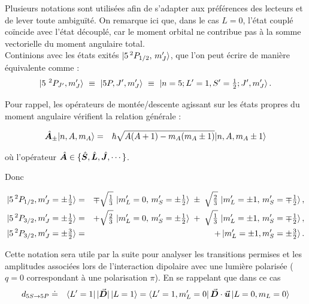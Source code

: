 Plusieurs notations sont utilisées afin de s’adapter aux préférences des lecteurs et de lever toute ambiguïté.
On remarque ici que, dans le cas $L = 0$, l’état couplé coïncide avec l’état découplé, car le moment orbital ne contribue pas à la somme vectorielle du moment angulaire total.\\

Continions avec les états exités $\ket{5\,^2P_{1/2},\,m_J'}$, que l’on peut écrire de manière équivalente comme :
\begin{eqnarray*}
	\ket{ 5{~}^2P_{J'} , m_J'  } ~\equiv~ \ket{ 5P , J'  , m_J' }  ~\equiv~ \ket{n=5 ; L'=1 , S'=\tfrac12 ;  J'  , m_J'  }.
\end{eqnarray*}

Pour rappel, les opérateurs de montée/descente agissant sur les états propres du moment angulaire vérifient la relation générale :


\begin{eqnarray}
	\hat{\bm{A}}_\pm \vert n , A , m	_A \rangle & = & \hbar \sqrt{A(A+1) - m_A(m_A\pm 1 ) } \vert n , A , m	_A \pm 1  \rangle
\end{eqnarray}

où l'opérateur $\hat{\bm{A}} \in \{ \hat{\bm{S}} , \hat{\bm{L}} , \hat{\bm{J}} , \cdots \}$.

Donc 

\begin{eqnarray*} 
	\ket{5\,^2P_{1/2},m_J' = \pm\tfrac12} &=& \mp\sqrt{\tfrac{1}{3}}\,\ket{ m_L'=0,\,m_S'=\pm\tfrac12} \;\pm\;\sqrt{\tfrac{2}{3}}\,\ket{m_L'=\pm 1,\,m_S'=\mp\tfrac12},\\ 
	\ket{5\,^2P_{3/2},m_J' = \pm\tfrac12} &=& +\sqrt{\tfrac{2}{3}}\,\ket{m_L'=0,\,m_S'=\pm\tfrac12} \;+\;\sqrt{\tfrac{1}{3}}\,\ket{ m_L'=\pm 1,\,m_S'=\mp\tfrac12},\\
	\ket{5\,^2P_{3/2},m_J' = \pm\tfrac32} &= & +\ket{m_L'=\pm 1 , m_S' = \pm \tfrac32}.  
\end{eqnarray*}
 
Cette notation sera utile par la suite pour analyser les transitions permises et les amplitudes associées lors de l’interaction dipolaire avec une lumière polarisée ($q = 0$ correspondant à une polarisation $\pi$). En se rappelant que dans ce cas 
\begin{eqnarray*}
	d_{\scriptstyle 5S \rightarrow 5P} & \doteq &\bra{L'=1} \vert \vec{{\bm{D}}} \vert \ket{L=1} = \bra{L'=1 , m_L' =0 }  \vec{{\bm{D}}} \cdot \vec{{\bm{u}}} \ket{L=0 , m_L = 0 }	
\end{eqnarray*}

